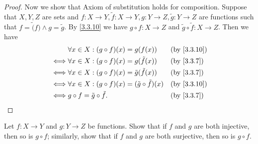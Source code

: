 \begin{proof}
  Now we show that Axiom of substitution holds for composition.
  Suppose that \(X, Y, Z\) are sets and \(f : X \to Y, \tilde{f} : X \to Y, g : Y \to Z, \tilde{g} : Y \to Z\) are functions such that \(f = \tilde(f) \land g = \tilde{g}\).
  By \cref{3.3.10} we have \(g \circ f : X \to Z\) and \(\tilde{g} \circ \tilde{f} : X \to Z\).
  Then we have
  \begin{align*}
         & \forall x \in X : (g \circ f)(x) = g(f(x))                        &  & \by{3.3.10} \\
    \iff & \forall x \in X : (g \circ f)(x) = g(\tilde{f}(x))                &  & \by{3.3.7}  \\
    \iff & \forall x \in X : (g \circ f)(x) = \tilde{g}(\tilde{f}(x))        &  & \by{3.3.7}  \\
    \iff & \forall x \in X : (g \circ f)(x) = (\tilde{g} \circ \tilde{f})(x) &  & \by{3.3.10} \\
    \iff & g \circ f = \tilde{g} \circ \tilde{f}.                            &  & \by{3.3.7}
  \end{align*}
\end{proof}

\begin{ex}\label{ex:3.3.2}
  Let \(f : X \to Y\) and \(g : Y \to Z\) be functions.
  Show that if \(f\) and \(g\) are both injective, then so is \(g \circ f\);
  similarly, show that if \(f\) and \(g\) are both surjective, then so is \(g \circ f\).
\end{ex}

